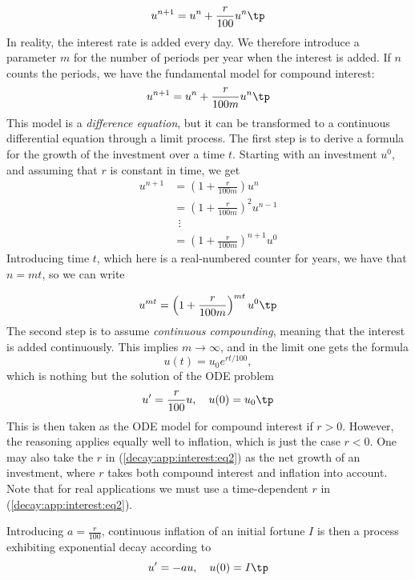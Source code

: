 \documentclass[graybox,sectrefs,envcountresetchap,open=right,final]{svmonodo}
\begin{document}
\[ u^{n+1} = u^n + \frac{r}{100}u^n
\tp  \]
In reality, the interest rate is added every day. We therefore introduce
a parameter $m$ for the number of periods per year when the interest
is added. If $n$ counts the periods, we have the fundamental model
for compound interest:
\begin{equation}
u^{n+1} = u^n + \frac{r}{100 m}u^n
\tp
\label{decay:app:interest:eq1}
\end{equation}
This model is a \emph{difference equation}, but it can be transformed to a
continuous differential equation through a limit process.
The first step is to derive a formula for the growth of the investment
over a time $t$.
Starting with an investment $u^0$, and assuming that $r$ is constant in time,
we get
\begin{align*}
u^{n+1} &= \left(1 + \frac{r}{100 m}\right)u^{n}\\ 
&= \left(1 + \frac{r}{100 m}\right)^2u^{n-1}\\ 
&\ \ \vdots\\ 
&= \left(1 +\frac{r}{100 m}\right)^{n+1}u^{0}
\end{align*}
Introducing time $t$, which here is a real-numbered counter for years,
we have that $n=mt$, so we can write

\[ u^{mt} = \left(1 + \frac{r}{100 m}\right)^{mt} u^0\tp  \]
The second step is to assume \emph{continuous compounding}, meaning that the
interest is added continuously. This implies $m\rightarrow\infty$, and
in the limit one gets the formula
\begin{equation}
u(t) = u_0e^{rt/100},
\end{equation}
which is nothing but the solution of the ODE problem
\begin{equation}
u^{\prime} = \frac{r}{100}u,\quad u(0)=u_0
\tp
\label{decay:app:interest:eq2}
\end{equation}
This is then taken as the ODE model for compound interest if $r>0$.
However, the reasoning applies equally well to inflation, which is
just the case $r < 0$.
One may also take the $r$ in (\ref{decay:app:interest:eq2})
as the net growth of an investment, where $r$ takes both compound interest
and inflation into account. Note that for real applications we must
use a time-dependent $r$ in (\ref{decay:app:interest:eq2}).

Introducing $a=\frac{r}{100}$, continuous inflation of an initial
fortune $I$ is then
a process exhibiting exponential decay according to
\[ u^{\prime} = -au,\quad u(0)=I\tp  \]
\end{document}
